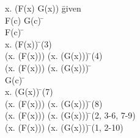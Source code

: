 \documentclass{article}
\begin{document}
\begin{proofbox}
\: \exists x. (F(x) \lor G(x)) \= \hbox{given} \\
\open
\: F(c) \lor G(c) \= \asm \\
\openAlt
\: F(c) \= \asm \\
\: \exists x. (F(x)) \= \existsintro(3) \\
\: (\exists x. (F(x))) \lor (\exists x. (G(x))) \= \orintro(4) \\
\: (\exists x. (F(x))) \lor (\exists x. (G(x))) \=  \\
\splitAlt
\: G(c) \= \asm \\
\: \exists x. (G(x)) \= \existsintro(7) \\
\: (\exists x. (F(x))) \lor (\exists x. (G(x))) \= \orintro(8) \\
\closeAlt
\: (\exists x. (F(x))) \lor (\exists x. (G(x))) \= \orelim(2, 3-6, 7-9) \\
\close
\: (\exists x. (F(x))) \lor (\exists x. (G(x))) \= \existselim(1, 2-10) \\
\end{proofbox}
\end{document}
